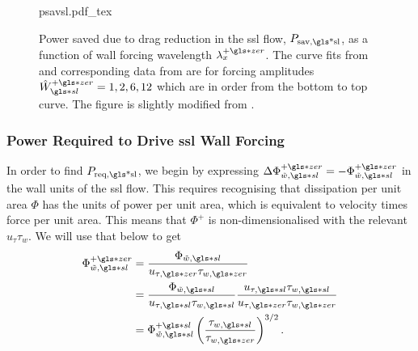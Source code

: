 \begin{figure}[htbp]
	\centering
	\def\svgwidth{0.7\textwidth}
	{psavsl.pdf_tex}
	\caption[$P_\text{sav,\gls*{sl}} $ as a function of wall forcing wavelength $\lambda_x\pz$]{Power saved due to drag reduction in the  \gls*{ssl} flow, $P_\text{sav,\gls*{sl}} $, as a function of wall forcing wavelength $\lambda_x\pz$. The curve fits from \textcite{chernyshenko2013} and corresponding data from \textcite{viotti2009} are for forcing amplitudes $\hat{W}\pz\ssl=1,2,6,12$ which are in order from the bottom to top curve. The figure is slightly modified from \cite{chernyshenko2013}.} 
	\label{fig:psavsl}
\end{figure}

\subsubsection{Power Required to Drive \gls*{ssl} Wall Forcing}
In order to find $P_\text{req,\gls*{sl}} $, we begin by expressing $\Delta \Phi _{\tilde{w},\gls*{sl}}\pz=-\Phi _{\tilde{w},\gls*{sl}}\pz$ in the wall units of the \gls*{ssl} flow. This requires recognising that dissipation per unit area $\Phi $ has the units of power per unit area, which is equivalent to velocity times force per unit area. This means that $\Phi^{+} $ is non-dimensionalised with the relevant $u_\tau \tau_w$. We will use that below to get
\begin{align}
	\Phi _{\tilde{w},\gls*{sl}}\pz &= \frac{\Phi _{\tilde{w},\gls*{sl}}}{u_{\tau,\gls*{zer}}\tau_{w,\gls*{zer}}}\\
	&=  \frac{\Phi _{\tilde{w},\gls*{sl}}}{u_{\tau,\gls*{sl}}\tau_{w,\gls*{sl}}}\frac{u_{\tau,\gls*{sl}}\tau_{w,\gls*{sl}}}{u_{\tau,\gls*{zer}}\tau_{w,\gls*{zer}}}\\
	&= \Phi _{\tilde{w},\gls*{sl}}\ps \left( \frac{\tau_{w,\gls*{sl}}}{\tau_{w,\gls*{zer}}} \right) ^{3 /2}\label{eq:fislconv}
.\end{align}

